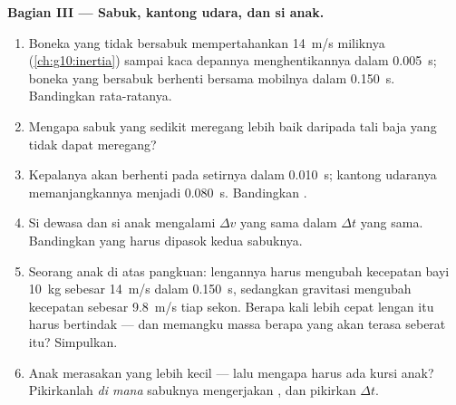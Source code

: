 \begin{problem}
\medskip
\noindent\textbf{Bagian III --- Sabuk, kantong udara, dan si anak.}
\begin{enumerate}[resume]
  \item Boneka yang tidak bersabuk mempertahankan \qty{14}{m/s} miliknya
        (\cref{ch:g10:inertia}) sampai kaca depannya menghentikannya
        dalam \qty{0.005}{s}; boneka yang bersabuk berhenti bersama
        mobilnya dalam \qty{0.150}{s}. Bandingkan  rata-ratanya.
  \item Mengapa sabuk yang sedikit meregang lebih baik daripada tali
        baja yang tidak dapat meregang?
  \item Kepalanya akan berhenti pada setirnya dalam \qty{0.010}{s};
        kantong udaranya memanjangkannya menjadi \qty{0.080}{s}.
        Bandingkan .
  \item Si dewasa dan si anak mengalami $\Delta v$ yang sama dalam
        $\Delta t$ yang sama. Bandingkan  yang harus dipasok
        kedua sabuknya.
  \item Seorang anak di atas pangkuan: lengannya harus mengubah
        kecepatan bayi \qty{10}{kg} sebesar \qty{14}{m/s} dalam
        \qty{0.150}{s}, sedangkan gravitasi mengubah kecepatan sebesar
        \qty{9.8}{m/s} tiap sekon. Berapa kali lebih cepat lengan itu
        harus bertindak --- dan memangku massa berapa yang akan terasa
        seberat itu? Simpulkan.
  \item Anak merasakan  yang lebih kecil --- lalu mengapa harus ada
        kursi anak? Pikirkanlah \emph{di mana} sabuknya mengerjakan
        , dan pikirkan $\Delta t$.
\end{enumerate}


\end{problem}
